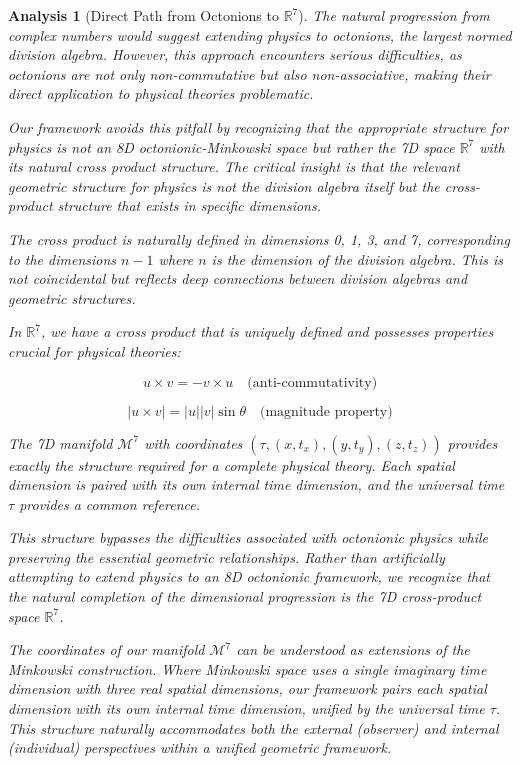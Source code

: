 \documentclass{article}
\newtheorem{analysis}{Analysis}
\begin{document}
\begin{analysis}[Direct Path from Octonions to $\mathbb{R}^7$]
The natural progression from complex numbers would suggest extending physics to octonions, the largest normed division algebra. However, this approach encounters serious difficulties, as octonions are not only non-commutative but also non-associative, making their direct application to physical theories problematic.

Our framework avoids this pitfall by recognizing that the appropriate structure for physics is not an 8D octonionic-Minkowski space but rather the 7D space $\mathbb{R}^7$ with its natural cross product structure. The critical insight is that the relevant geometric structure for physics is not the division algebra itself but the cross-product structure that exists in specific dimensions.

The cross product is naturally defined in dimensions 0, 1, 3, and 7, corresponding to the dimensions $n-1$ where $n$ is the dimension of the division algebra. This is not coincidental but reflects deep connections between division algebras and geometric structures.

In $\mathbb{R}^7$, we have a cross product that is uniquely defined and possesses properties crucial for physical theories:

\begin{equation}
u \times v = -v \times u \quad \text{(anti-commutativity)}
\end{equation}

\begin{equation}
|u \times v| = |u||v|\sin\theta \quad \text{(magnitude property)}
\end{equation}

The 7D manifold $\mathcal{M}^7$ with coordinates $(\tau, (x, t_x), (y, t_y), (z, t_z))$ provides exactly the structure required for a complete physical theory. Each spatial dimension is paired with its own internal time dimension, and the universal time $\tau$ provides a common reference.

This structure bypasses the difficulties associated with octonionic physics while preserving the essential geometric relationships. Rather than artificially attempting to extend physics to an 8D octonionic framework, we recognize that the natural completion of the dimensional progression is the 7D cross-product space $\mathbb{R}^7$.

The coordinates of our manifold $\mathcal{M}^7$ can be understood as extensions of the Minkowski construction. Where Minkowski space uses a single imaginary time dimension with three real spatial dimensions, our framework pairs each spatial dimension with its own internal time dimension, unified by the universal time $\tau$. This structure naturally accommodates both the external (observer) and internal (individual) perspectives within a unified geometric framework.
\end{analysis}
\end{document}
